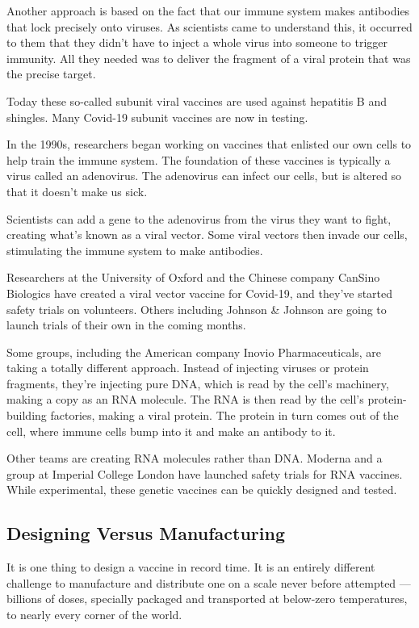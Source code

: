 Another approach is based on the fact that our immune system makes
antibodies that lock precisely onto viruses. As scientists came to
understand this, it occurred to them that they didn't have to inject a
whole virus into someone to trigger immunity. All they needed was to
deliver the fragment of a viral protein that was the precise target.

Today these so-called subunit viral vaccines are used against hepatitis
B and shingles. Many Covid-19 subunit vaccines are now in testing.

In the 1990s, researchers began working on vaccines that enlisted our
own cells to help train the immune system. The foundation of these
vaccines is typically a virus called an adenovirus. The adenovirus can
infect our cells, but is altered so that it doesn't make us sick.

Scientists can add a gene to the adenovirus from the virus they want to
fight, creating what's known as a viral vector. Some viral vectors then
invade our cells, stimulating the immune system to make antibodies.

Researchers at the University of Oxford and the Chinese company CanSino
Biologics have created a viral vector vaccine for Covid-19, and they've
started safety trials on volunteers. Others including Johnson \& Johnson
are going to launch trials of their own in the coming months.

Some groups, including the American company Inovio Pharmaceuticals, are
taking a totally different approach. Instead of injecting viruses or
protein fragments, they're injecting pure DNA, which is read by the
cell's machinery, making a copy as an RNA molecule. The RNA is then read
by the cell's protein-building factories, making a viral protein. The
protein in turn comes out of the cell, where immune cells bump into it
and make an antibody to it.

Other teams are creating RNA molecules rather than DNA. Moderna and a
group at Imperial College London have launched safety trials for RNA
vaccines. While experimental, these genetic vaccines can be quickly
designed and tested.

\hypertarget{designing-versus-manufacturing}{%
\subsection{Designing Versus
Manufacturing}\label{designing-versus-manufacturing}}

It is one thing to design a vaccine in record time. It is an entirely
different challenge to manufacture and distribute one on a scale never
before attempted --- billions of doses, specially packaged and
transported at below-zero temperatures, to nearly every corner of the
world.

